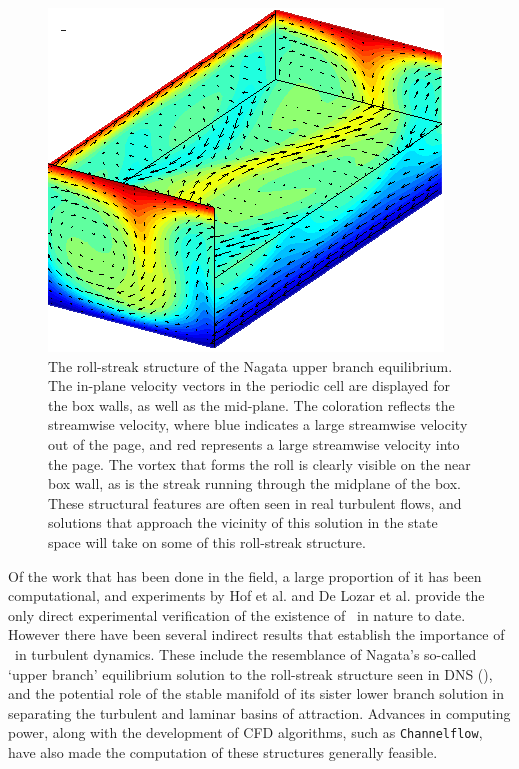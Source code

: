 \begin{figure}[t]
\centerline{\includegraphics[scale=0.5]{Figs/rollStreak}}
\caption{The roll-streak structure of the Nagata upper branch equilibrium. The in-plane velocity vectors in the periodic cell are displayed for the box walls, as well as the mid-plane. The coloration reflects the streamwise velocity, where blue indicates a large streamwise velocity out of the page, and red represents a large streamwise velocity into the page. The vortex that forms the roll is clearly visible on the near box wall, as is the streak running through the midplane of the box. These structural features are often seen in real turbulent flows, and solutions that approach the vicinity of this solution in the state space will take on some of this roll-streak structure.}\label{fig:rollstreak}
\end{figure}


Of the work that has been done in the field, a large proportion of it has been computational, and experiments by Hof et al. and De Lozar et al. provide the only direct experimental verification of the existence of \ecs~in nature to date. However there have been several indirect results that establish the importance of \ecs\  in turbulent dynamics. These include the resemblance of Nagata's so-called `upper branch' equilibrium solution to the roll-streak structure seen in DNS (), and the potential role of the stable manifold of its sister lower branch solution in separating the turbulent and laminar basins of attraction. Advances in computing power, along with the development of CFD algorithms, such as {\tt Channelflow}, have also made the computation of these structures generally feasible.\\

